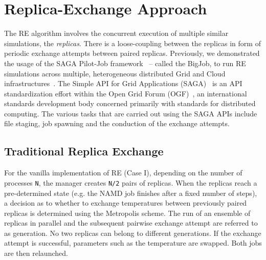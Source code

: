 \documentclass[a4paper,10pt]{article}
\newcommand{\jhanote}[1]{ {\textcolor{red} { ***shantenu: #1 }}}
\newcommand{\alnote}[1]{ {\textcolor{blue} { ***andre: #1 }}}
\newcommand{\athotanote}[1]{ {\textcolor{green} { ***athota: #1 }}}
\newcommand{\alnote}[1]{}
\newcommand{\jhanote}[1]{}
\newcommand{\athotanote}[1]{}
\begin{document}

\section{Replica-Exchange Approach}

The RE algorithm involves the concurrent execution of multiple similar
simulations, the \emph{replicas}.  There is a loose-coupling between
the replicas in form of periodic exchange attempts between paired
replicas. Previously, we demonstrated the usage of the SAGA Pilot-Job
framework~\cite{saga_bigjob_condor_cloud} -- called the BigJob, to run
RE simulations across multiple, heterogeneous
distributed Grid and Cloud infrastructures~\cite{Luckow:2008fp}.
The Simple API for Grid Applications (SAGA)~\cite{saga_gfd90} is an
API standardization effort within the Open Grid Forum
(OGF)~\cite{ogf_web}, an international standards development body
concerned primarily with standards for distributed computing.
The various tasks that are carried out using the SAGA APIs include file staging, job
spawning and the conduction of the exchange attempts.


\subsection{Traditional Replica Exchange}
For the vanilla implementation of RE (Case I), depending
on the number of processes \texttt{N}, the manager creates \texttt{N/2} pairs
of replicas. When the replicas reach a
pre-determined state (e.g. the NAMD job finishes after a fixed number
of steps), a decision as to whether to exchange temperatures between
previously paired replicas is determined using the Metropolis scheme.
The run of an ensemble of replicas in parallel and the subsequent
pairwise exchange attempt are referred to as generation. No two
replicas can belong to different generations. If the exchange attempt
is successful, parameters such as the temperature are swapped. Both
jobs are then relaunched. %
 
\end{document}
